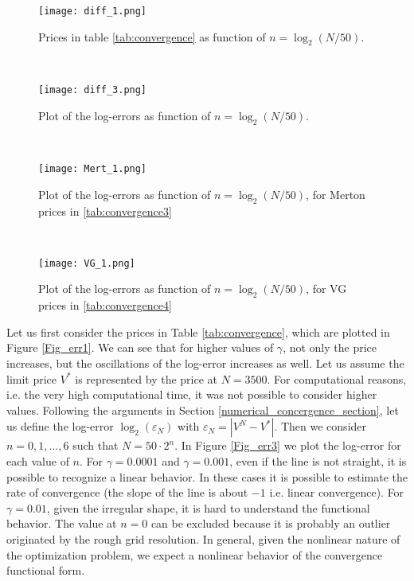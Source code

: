 \begin{figure}[t!]
 \begin{minipage}[b]{0.5\linewidth}
   \centering
   \texttt{[image: diff\_1.png]}
   \caption{Prices in table \ref{tab:convergence} as function of $n=\log_2(N/50)$.}
   \label{Fig_err1} 
 \end{minipage}
  \
  \begin{minipage}[b]{0.5\linewidth}
  \centering
   \texttt{[image: diff\_3.png]}
   \caption{Plot of the log-errors as function of $n=\log_2(N/50)$.}
   \label{Fig_err3}
 \end{minipage}
 \
  \begin{minipage}[b]{0.5\linewidth}
   \centering
   \texttt{[image: Mert\_1.png]}
   \caption{Plot of the log-errors as function of $n=\log_2(N/50)$, for Merton prices in \ref{tab:convergence3}}
   \label{Fig_err4} 
 \end{minipage}
 \
 \begin{minipage}[b]{0.5\linewidth}
   \texttt{[image: VG\_1.png]}
   \caption{Plot of the log-errors as function of $n=\log_2(N/50)$, for VG prices in \ref{tab:convergence4}}
   \label{Fig_err5}
 \end{minipage}
\end{figure} 

Let us first consider the prices in Table \ref{tab:convergence}, which are plotted in Figure \ref{Fig_err1}. 
We can see that for higher values of $\gamma$, not only the price increases, but the oscillations of the log-error increases as well.
Let us assume the limit price $V^*$ is represented by the price at $N=3500$. 
For computational reasons, i.e. the very high computational time, it was not possible to consider higher values. 
Following the arguments in Section \ref{numerical_concergence_section}, let us define the log-error $\log_2 (\varepsilon_N)$ with $\varepsilon_N = |V^N - V^*|$. 
Then we consider $n = 0,1,...,6$ such that $N = 50\cdot2^n$.
In Figure \ref{Fig_err3} we plot the log-error for each value of $n$.
For $\gamma=0.0001$ and $\gamma=0.001$, even if the line is not straight, it is possible to recognize a linear behavior.  
In these cases it is possible to estimate the rate of convergence (the slope of the line is about $-1$ i.e. linear convergence).  
For $\gamma=0.01$, given the irregular shape, it is hard to understand the functional behavior. 
The value at $n=0$ can be excluded because it is probably an outlier originated by the rough grid resolution.
In general, given the nonlinear nature of the optimization problem, we expect a nonlinear behavior of the convergence functional form.

